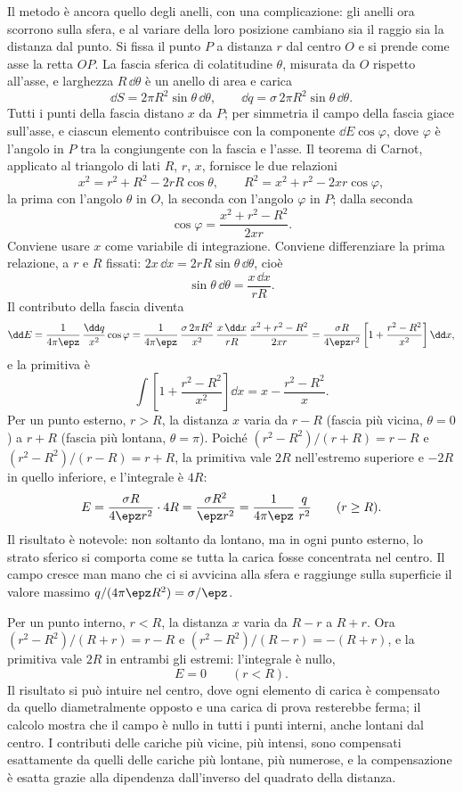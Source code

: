 \documentclass[main.tex]{subfiles}
\begin{document}
Il metodo è ancora quello degli anelli, con una complicazione: gli anelli ora scorrono sulla sfera, e al variare della loro posizione cambiano sia il raggio sia la distanza dal punto. Si fissa il punto $P$ a distanza $r$ dal centro $O$ e si prende come asse la retta $OP$. La fascia sferica di colatitudine $\theta$, misurata da $O$ rispetto all'asse, e larghezza $R\,\dd\theta$ è un anello di area e carica
\[
\dd S=2\pi R^2\sin\theta\,\dd\theta,\qquad \dd q=\sigma\,2\pi R^2\sin\theta\,\dd\theta .
\]
Tutti i punti della fascia distano $x$ da $P$; per simmetria il campo della fascia giace sull'asse, e ciascun elemento contribuisce con la componente $\dd E\cos\varphi$, dove $\varphi$ è l'angolo in $P$ tra la congiungente con la fascia e l'asse. Il teorema di Carnot, applicato al triangolo di lati $R$, $r$, $x$, fornisce le due relazioni
\[
x^2=r^2+R^2-2rR\cos\theta, \qquad R^2=x^2+r^2-2xr\cos\varphi ,
\]
la prima con l'angolo $\theta$ in $O$, la seconda con l'angolo $\varphi$ in $P$; dalla seconda
\[
\cos\varphi=\frac{x^2+r^2-R^2}{2xr} .
\]
Conviene usare $x$ come variabile di integrazione. Conviene differenziare la prima relazione, a $r$ e $R$ fissati: $2x\,\dd x=2rR\sin\theta\,\dd\theta$, cioè
\[
\sin\theta\,\dd\theta=\frac{x\,\dd x}{rR} .
\]
Il contributo della fascia diventa
\[
\dd E=\frac{1}{4\pi\epz}\,\frac{\dd q}{x^2}\cos\varphi=\frac{1}{4\pi\epz}\,\frac{\sigma\,2\pi R^2}{x^2}\,\frac{x\,\dd x}{rR}\,\frac{x^2+r^2-R^2}{2xr}=\frac{\sigma R}{4\epz r^2}\left[1+\frac{r^2-R^2}{x^2}\right]\dd x ,
\]
e la primitiva è
\[
\int\left[1+\frac{r^2-R^2}{x^2}\right]\dd x = x - \frac{r^2-R^2}{x} .
\]
Per un punto esterno, $r>R$, la distanza $x$ varia da $r-R$ (fascia più vicina, $\theta=0$) a $r+R$ (fascia più lontana, $\theta=\pi$). Poiché $(r^2-R^2)/(r+R)=r-R$ e $(r^2-R^2)/(r-R)=r+R$, la primitiva vale $2R$ nell'estremo superiore e $-2R$ in quello inferiore, e l'integrale è $4R$:
\[
E=\frac{\sigma R}{4\epz r^2}\cdot4R=\frac{\sigma R^2}{\epz r^2}=\frac{1}{4\pi\epz}\,\frac{q}{r^2}\qquad(r\ge R) .
\]
Il risultato è notevole: non soltanto da lontano, ma in ogni punto esterno, lo strato sferico si comporta come se tutta la carica fosse concentrata nel centro. Il campo cresce man mano che ci si avvicina alla sfera e raggiunge sulla superficie il valore massimo $q/(4\pi\epz R^2)=\sigma/\epz$.

Per un punto interno, $r<R$, la distanza $x$ varia da $R-r$ a $R+r$. Ora $(r^2-R^2)/(R+r)=r-R$ e $(r^2-R^2)/(R-r)=-(R+r)$, e la primitiva vale $2R$ in entrambi gli estremi: l'integrale è nullo,
\[
E=0\qquad(r<R) .
\]
Il risultato si può intuire nel centro, dove ogni elemento di carica è compensato da quello diametralmente opposto e una carica di prova resterebbe ferma; il calcolo mostra che il campo è nullo in tutti i punti interni, anche lontani dal centro. I contributi delle cariche più vicine, più intensi, sono compensati esattamente da quelli delle cariche più lontane, più numerose, e la compensazione è esatta grazie alla dipendenza dall'inverso del quadrato della distanza.
\end{document}
